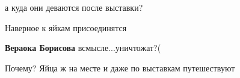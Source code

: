  
 
 
 
 

\qqSecCmt


а куда они деваются после выставки?

\begin{itemize} %

Наверное к яйкам присоединятся

\textbf{Вераока Борисова} всмысле...уничтожат?(


Почему? Яйца ж на месте и даже по выставкам путешествуют
\end{itemize} %
